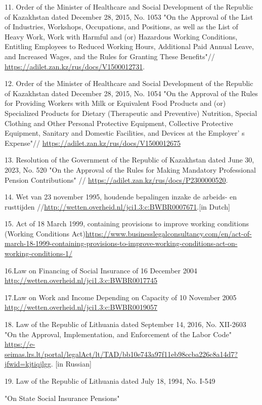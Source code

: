 \begin{references}
11. Order of the Minister of Healthcare and Social Development of the
Republic of Kazakhstan dated December 28, 2015, No. 1053 "On the
Approval of the List of Industries, Workshops, Occupations, and
Positions, as well as the List of Heavy Work, Work with Harmful and (or)
Hazardous Working Conditions, Entitling Employees to Reduced Working
Hours, Additional Paid Annual Leave, and Increased Wages, and the Rules
for Granting These Benefits"//
\url{https://adilet.zan.kz/rus/docs/V1500012731}.

12. Order of the Minister of Healthcare and Social Development of the
Republic of Kazakhstan dated December 28, 2015, No. 1054 "On the
Approval of the Rules for Providing Workers with Milk or Equivalent Food
Products and (or) Specialized Products for Dietary (Therapeutic and
Preventive) Nutrition, Special Clothing and Other Personal Protective
Equipment, Collective Protective Equipment, Sanitary and Domestic
Facilities, and Devices at the Employer' s Expense"//
\url{https://adilet.zan.kz/rus/docs/V1500012675}

13. Resolution of the Government of the Republic of Kazakhstan dated
June 30, 2023, No. 520 "On the Approval of the Rules for Making
Mandatory Professional Pension Contributions" //
\url{https://adilet.zan.kz/rus/docs/P2300000520}.

14. Wet van 23 november 1995, houdende bepalingen inzake de arbeids- en
rusttijden //\url{http://wetten.overheid.nl/jci1.3:c:BWBR0007671}.{[}in
Dutch{]}

15. Act of 18 March 1999, containing provisions to improve working
conditions (Working Conditions
Act)\url{https://www.businesslegalconsultancy.com/en/act-of-march-18-1999-containing-provisions-to-improve-working-conditions-act-on-working-conditions-1/}

16.Law on Financing of Social Insurance of 16 December 2004
\url{http://wetten.overheid.nl/jci1.3:c:BWBR0017745}

17.Law on Work and Income Depending on Capacity of 10 November 2005
\url{http://wetten.overheid.nl/jci1.3:c:BWBR0019057}

18. Law of the Republic of Lithuania dated September 14, 2016, No.
XII-2603 "On the Approval, Implementation, and Enforcement of the Labor
Code"
\url{https://e-seimas.lrs.lt/portal/legalAct/lt/TAD/bb10e743a97f11eb98ccba226c8a14d7?jfwid=kjtiqjlgg}.
{[}in Russian{]}

19. Law of the Republic of Lithuania dated July 18, 1994, No. I-549

"On State Social Insurance Pensions"


\end{references}
